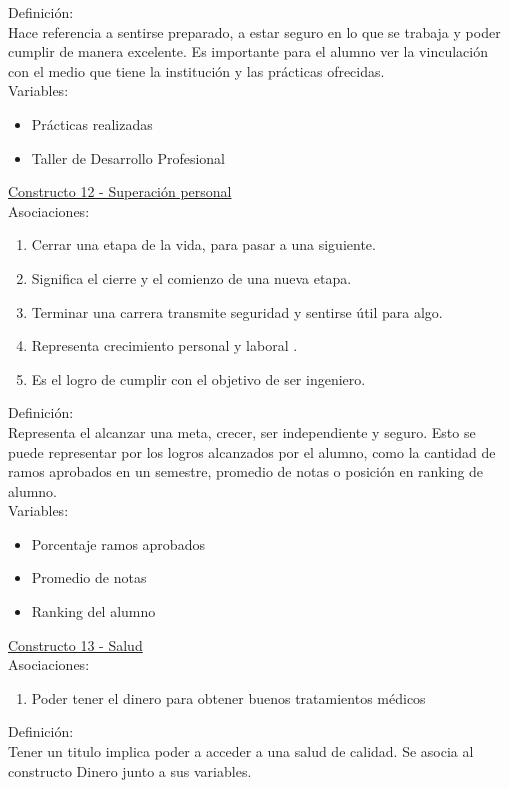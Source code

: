 Definición:\\

Hace referencia a sentirse preparado, a estar seguro en lo que se trabaja y poder cumplir de manera excelente. Es importante para el alumno ver la vinculación con el medio que tiene la institución y las prácticas ofrecidas.\\

Variables:
\begin{itemize}
	\item Prácticas realizadas
	\item Taller de Desarrollo Profesional	
\end{itemize} 

\underline {Constructo 12 - Superación personal} \\
Asociaciones:
\begin{enumerate}
	\item Cerrar una etapa de la vida, para pasar a una siguiente.
	\item Significa el cierre y el comienzo de una nueva etapa.
	\item Terminar una carrera transmite seguridad y sentirse útil para algo.
	\item Representa crecimiento personal y laboral	.
	\item Es el logro de cumplir con el objetivo de ser ingeniero.
\end{enumerate}

Definición:\\
Representa el alcanzar una meta, crecer, ser independiente y seguro. Esto se puede representar por los logros alcanzados por el alumno, como la cantidad de ramos aprobados en un semestre, promedio de notas o posición en ranking de alumno.\\

Variables:
\begin{itemize}
	\item Porcentaje ramos aprobados
	\item Promedio de notas
	\item Ranking del alumno	
\end{itemize} 

\underline {Constructo 13 - Salud} \\
Asociaciones:
\begin{enumerate}
	\item Poder tener el dinero para obtener buenos tratamientos médicos		
\end{enumerate}

Definición:\\
Tener un titulo implica poder a acceder a una salud de calidad. Se asocia al constructo Dinero junto a sus variables.\\

